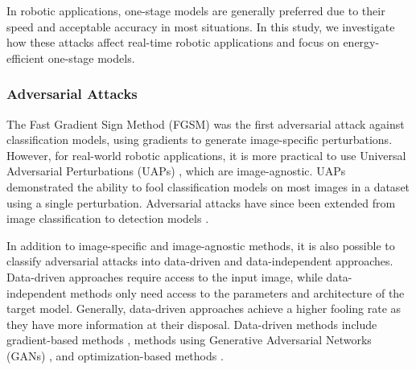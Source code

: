 

In robotic applications, one-stage models are generally preferred due to their speed and acceptable accuracy in most situations. In this study, we investigate how these attacks affect real-time robotic applications and focus on energy-efficient one-stage models.



\subsubsection{Adversarial Attacks}

The Fast Gradient Sign Method (FGSM) \cite{GoodfellowSS14} was the first adversarial attack against classification models, using gradients to generate image-specific perturbations. However, for real-world robotic applications, it is more practical to use Universal Adversarial Perturbations (UAPs) \cite{moosavi2017universal}, which are image-agnostic. UAPs demonstrated the ability to fool classification models on most images in a dataset using a single perturbation. Adversarial attacks have since been extended from image classification to detection models \cite{gurbaxani2018traits}.

In addition to image-specific and image-agnostic methods, it is also possible to classify adversarial attacks into data-driven and data-independent approaches. Data-driven approaches require access to the input image, while data-independent methods only need access to the parameters and architecture of the target model. Generally, data-driven approaches achieve a higher fooling rate as they have more information at their disposal. Data-driven methods include gradient-based methods \cite{chow2020adversarial,li2021universal,mohamad2021, xie2017adversarial}, methods using Generative Adversarial Networks (GANs) \cite{hashemi2020transferable,Wei2019}, and optimization-based methods \cite{carlini2017towards,liao2021transferable}. 

